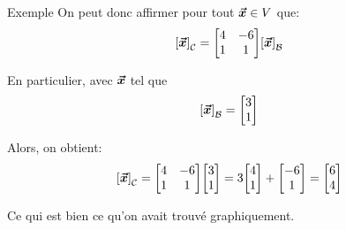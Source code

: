 \documentclass[a4paper]{article}
\begin{document}
\begin{parag}{Exemple}
    On peut donc affirmer pour tout $\bm{\protect\vec{x}} \in V$ que:
    \[\left[\bvec{x}\right]_{\mathcal{C}} = \begin{bmatrix} 4 & -6 \\ 1 & 1 \end{bmatrix} \left[\bvec{x}\right]_{\mathcal{B}}\]

    En particulier, avec $\bm{\protect\vec{x}}$ tel que
    \[\left[\bvec{x}\right]_{\mathcal{B}} = \begin{bmatrix} 3 \\ 1 \end{bmatrix} \]

    Alors, on obtient:
    \[\left[\bvec{x}\right]_{\mathcal{C}} = \begin{bmatrix} 4 & -6 \\ 1 & 1 \end{bmatrix} \begin{bmatrix} 3 \\ 1 \end{bmatrix} = 3\begin{bmatrix} 4 \\ 1 \end{bmatrix} + \begin{bmatrix} -6 \\ 1 \end{bmatrix} = \begin{bmatrix} 6 \\ 4 \end{bmatrix}\]

    Ce qui est bien ce qu'on avait trouvé graphiquement.
\end{parag}
\end{document}
